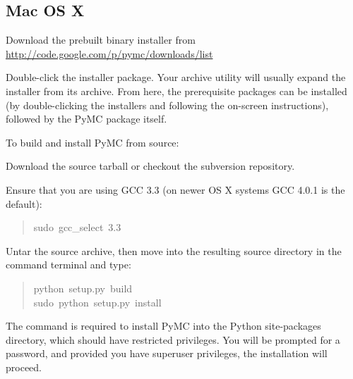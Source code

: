 \subsection*{Mac OS X}
\label{mac-os-x}
\setcounter{listcnt0}{0}
\begin{list}{.}
{
\setlength{\rightmargin}{\leftmargin}
}
\item {} 
Download the prebuilt binary installer from \href{http://code.google.com/p/pymc/downloads/list}{http://code.google.com/p/pymc/downloads/list}

\item {} 
Double-click the installer package. Your archive utility will usually expand
the installer from its archive. From here, the prerequisite packages can be
installed (by double-clicking the installers and following the on-screen
instructions), followed by the PyMC package itself.

\end{list}

To build and install PyMC from source:
\setcounter{listcnt0}{0}
\begin{list}{.}
{
\setlength{\rightmargin}{\leftmargin}
}
\item {} 
Download the source tarball or checkout the subversion repository.

\item {} 
Ensure that you are using GCC 3.3 (on newer OS X systems GCC 4.0.1 is the default):
\begin{quote}{\ttfamily \raggedright \noindent
sudo~gcc{\_}select~3.3
}\end{quote}

\item {} 
Untar the source archive, then move into the resulting source directory in
the command terminal and type:
\begin{quote}{\ttfamily \raggedright \noindent
python~setup.py~build~\\
sudo~python~setup.py~install
}\end{quote}

\end{list}

The  command is required to install PyMC into the Python site-packages
directory, which should have restricted privileges. You will be prompted for a
password, and provided you have superuser privileges, the installation will
proceed.



